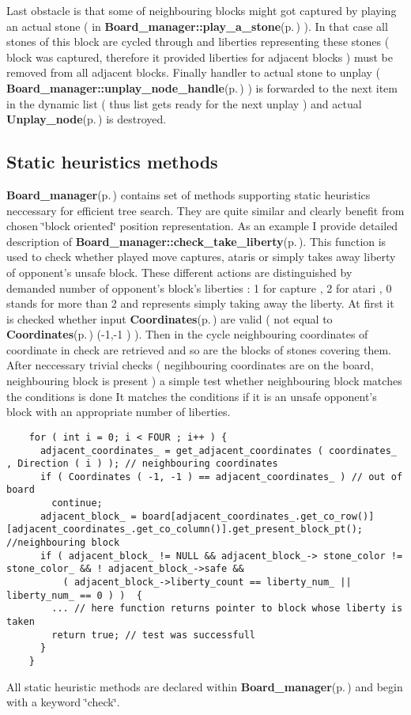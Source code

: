 Last obstacle is that some of neighbouring blocks might got captured by playing an actual stone ( in {\bf Board\_\-manager::play\_\-a\_\-stone}{\rm (p.\,\pageref{classBoard__manager_a4})} ). In that case all stones of this block are cycled through and liberties representing these stones ( block was captured, therefore it provided liberties for adjacent blocks ) must be removed from all adjacent blocks. Finally handler to actual stone to unplay ( {\bf Board\_\-manager::unplay\_\-node\_\-handle}{\rm (p.\,\pageref{classBoard__manager_o6})} ) is forwarded to the next item in the dynamic list ( thus list gets ready for the next unplay ) and actual {\bf Unplay\_\-node}{\rm (p.\,\pageref{structUnplay__node})} is destroyed.\subsection{Static heuristics methods}\label{page_6_page_6__sec_5}
{\bf Board\_\-manager}{\rm (p.\,\pageref{classBoard__manager})} contains set of methods supporting static heuristics neccessary for efficient tree search. They are quite similar and clearly benefit from chosen \char`\"{}block oriented\char`\"{} position representation. As an example I provide detailed description of {\bf Board\_\-manager::check\_\-take\_\-liberty}{\rm (p.\,\pageref{classBoard__manager_a26})}. This function is used to check whether played move captures, ataris or simply takes away liberty of opponent's unsafe block. These different actions are distinguished by demanded number of opponent's block's liberties : 1 for capture , 2 for atari , 0 stands for more than 2 and represents simply taking away the liberty. At first it is checked whether input {\bf Coordinates}{\rm (p.\,\pageref{classCoordinates})} are valid ( not equal to {\bf Coordinates}{\rm (p.\,\pageref{classCoordinates})} (-1,-1 ) ). Then in the cycle neighbouring coordinates of coordinate in check are retrieved and so are the blocks of stones covering them. After neccessary trivial checks ( negihbouring coordinates are on the board, neighbouring block is present ) a simple test whether neighbouring block matches the conditions is done It matches the conditions if it is an unsafe opponent's block with an appropriate number of liberties.



\footnotesize\begin{verbatim}    for ( int i = 0; i < FOUR ; i++ ) {
      adjacent_coordinates_ = get_adjacent_coordinates ( coordinates_ , Direction ( i ) ); // neighbouring coordinates
      if ( Coordinates ( -1, -1 ) == adjacent_coordinates_ ) // out of board
        continue;
      adjacent_block_ = board[adjacent_coordinates_.get_co_row()][adjacent_coordinates_.get_co_column()].get_present_block_pt(); //neighbouring block
      if ( adjacent_block_ != NULL && adjacent_block_-> stone_color != stone_color_ && ! adjacent_block_->safe && 
          ( adjacent_block_->liberty_count == liberty_num_ || liberty_num_ == 0 ) )  {
        ... // here function returns pointer to block whose liberty is taken 
        return true; // test was successfull
      }
    }
\end{verbatim}
\normalsize


All static heuristic methods are declared within {\bf Board\_\-manager}{\rm (p.\,\pageref{classBoard__manager})} and begin with a keyword \char`\"{}check\char`\"{}. 